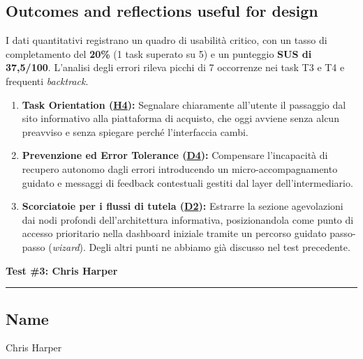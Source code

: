 ﻿\documentclass[11pt,a4paper]{article}
\begin{document}
\subsection*{Outcomes and reflections useful for design}
\begin{tcolorbox}[base]
I dati quantitativi registrano un quadro di usabilità critico, con un tasso di completamento del \textbf{20\%} (1 task superato su 5) e un punteggio \textbf{SUS di 37,5/100}. L'analisi degli errori rileva picchi di 7 occorrenze nei task T3 e T4 e frequenti \textit{backtrack}.

\medskip
\begin{enumerate}[leftmargin=*]
    \item \textbf{Task Orientation (\hyperref[iss:H4]{H4}):} Segnalare chiaramente all'utente il passaggio dal sito informativo alla piattaforma di acquisto, che oggi avviene senza alcun preavviso e senza spiegare perché l'interfaccia cambi.
    \item \textbf{Prevenzione ed Error Tolerance (\hyperref[iss:D4]{D4}):} Compensare l'incapacità di recupero autonomo dagli errori introducendo un micro-accompagnamento guidato e messaggi di feedback contestuali gestiti dal layer dell'intermediario.
    \item     \textbf{Scorciatoie per i flussi di tutela (\hyperref[iss:D2]{D2}):} Estrarre la sezione agevolazioni dai nodi profondi dell'architettura informativa, posizionandola come punto di accesso prioritario nella dashboard iniziale tramite un percorso guidato passo-passo (\textit{wizard}).
    Degli altri punti ne abbiamo già discusso nel test precedente.
\end{enumerate}
\end{tcolorbox}


\newpage
\begin{center}
  {\color{primaryColor}\large\bfseries Test \#3: Chris Harper}\\
  \vspace{0.1cm}
  \color{borderColor}\hrule
\end{center}

\vspace{0.5cm}

\subsection*{Name}
\begin{tcolorbox}[base]
Chris Harper
\end{tcolorbox}
\end{document}
